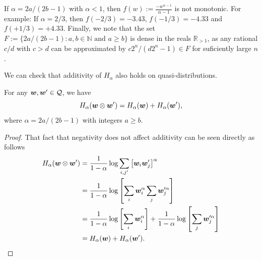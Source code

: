\documentclass[pra,
aps,
twocolumn,
superscriptaddress,
groupedaddress,
nofootinbib,
reprint
]{revtex4-1}
\begin{document}
If $\alpha =2a/(2b-1)$ with $\alpha < 1$, then $f(w) := \frac{-w^{\alpha-1}}{\alpha-1}$ is not monotonic. For example: If $\alpha = 2/3$, then $f(-2/3) = -3.43$, $f(-1/3) = -4.33$ and $f(+1/3) = +4.33$. Finally, we note that the set $F := \{2a/(2b-1): a,b \in \mathbb{N} \text{ and } a \geq b\}$ is dense in the reals $\mathbb{R}_{>1}$, as any rational $c/d$ with $c>d$ can be approximated by  $c2^n / (d2^n-1) \in F$ for suficiently large $n$.

We can check that additivity of $H_{\alpha}$ also holds on quasi-distributions. 
\begin{lemma}\label{H_add}
	For any $\boldsymbol{w}, \boldsymbol{w}' \in \mathcal{Q}$, we have
	\begin{equation}
		H_{\alpha}(\boldsymbol{w}\otimes \boldsymbol{w}') = H_{\alpha}(\boldsymbol{w}) + H_{\alpha}(\boldsymbol{w}'),
	\end{equation}
	where $\alpha = 2a/(2b-1)$ with integers $a\ge b$.
\end{lemma}
\begin{proof}
	That fact that negativity does not affect additivity can be seen directly as follows
	\begin{align*}
		H_{\alpha}(\boldsymbol{w} \otimes \boldsymbol{w}') &= \frac{1}{1-\alpha}\log \sum_{i,j'} \left[\boldsymbol{w}_i \boldsymbol{w}'_j\right]^{\alpha} \\
		&= \frac{1}{1-\alpha}\log  \left [ \sum_i\boldsymbol{w}_i^\alpha \sum_j\boldsymbol{w}_j^{\prime \alpha} \right ] \\
				&= \frac{1}{1-\alpha}\log  \left [ \sum_i\boldsymbol{w}_i^\alpha\right ] + \frac{1}{1-\alpha}\log \left [ \sum_j\boldsymbol{w}_j^{\prime \alpha} \right ] \\
		&= H_{\alpha}(\boldsymbol{w}) + H_{\alpha}(\boldsymbol{w}').
	\end{align*}
\end{proof}
\end{document}
